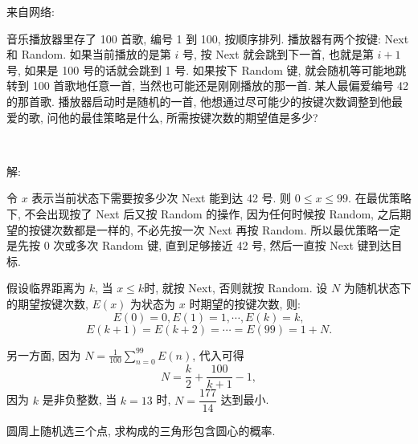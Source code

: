 \newpage
\noindent 来自网络: 

音乐播放器里存了 100 首歌, 编号 1 到 100, 按顺序排列. 播放器有两个按键: Next 和 Random. 如果当前播放的是第 $i$ 号, 按 Next 就会跳到下一首, 也就是第 $i+1$ 号, 如果是 100 号的话就会跳到 1 号. 如果按下 Random 键, 就会随机等可能地跳转到 100 首歌地任意一首, 当然也可能还是刚刚播放的那一首. 某人最偏爱编号 42 的那首歌. 播放器启动时是随机的一首, 他想通过尽可能少的按键次数调整到他最爱的歌, 问他的最佳策略是什么, 所需按键次数的期望值是多少?

~

\noindent 解:

令 $x$ 表示当前状态下需要按多少次 Next 能到达 42 号. 则 $ 0\le x\le 99$. 在最优策略下, 不会出现按了 Next 后又按 Random 的操作, 因为任何时候按 Random, 之后期望的按键次数都是一样的, 不必先按一次 Next 再按 Random. 所以最优策略一定是先按 0 次或多次 Random 键, 直到足够接近 42 号, 然后一直按 Next 键到达目标.

假设临界距离为 $k$, 当 $x\le k$时, 就按 Next, 否则就按 Random. 设 $N$ 为随机状态下的期望按键次数, $E(x)$ 为状态为 $x$ 时期望的按键次数, 则:
\[E(0) = 0, E(1) = 1, \cdots, E(k) = k,\]
\[E(k+1) = E(k+2) = \cdots = E(99) = 1 + N .\]

另一方面, 因为 $\displaystyle N = \frac{1}{100}\sum_{n=0}^{99}{E(n)}$, 代入可得
\[ N = \frac{k}{2} + \frac{100}{k+1} - 1, \]
因为 $k$ 是非负整数, 当 $k=13$ 时, $N=\dfrac{177}{14}$ 达到最小.

\newpage

圆周上随机选三个点, 求构成的三角形包含圆心的概率.
\begin{figure*}[htbp]
\centering
{}
\end{figure*}

